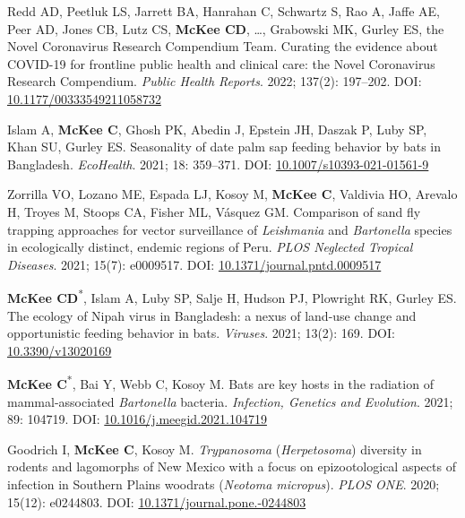 \documentclass{cv}
\begin{document}
\begin{pubenum}
\item Redd AD, Peetluk LS, Jarrett BA, Hanrahan C, Schwartz S, Rao A, Jaffe AE, Peer AD, Jones CB, Lutz CS, \textbf{McKee CD}, …, Grabowski MK, Gurley ES, the Novel Coronavirus Research Compendium Team. Curating the evidence about COVID-19 for frontline public health and clinical care: the Novel Coronavirus Research Compendium. \textit{Public Health Reports}. 2022; 137(2): 197--202. DOI: \href{https://doi.org/10.1177/00333549211058732}{10.1177/00333549211058732}

\item Islam A, \textbf{McKee C}, Ghosh PK, Abedin J, Epstein JH, Daszak P, Luby SP, Khan SU, Gurley ES. Seasonality of date palm sap feeding behavior by bats in Bangladesh. \textit{EcoHealth}. 2021; 18: 359--371. DOI: \href{https://doi.org/10.1007/s10393-021-01561-9}{10.1007/s10393-021-01561-9}

\item Zorrilla VO, Lozano ME, Espada LJ, Kosoy M, \textbf{McKee C}, Valdivia HO, Arevalo H, Troyes M, Stoops CA, Fisher ML, Vásquez GM. Comparison of sand fly trapping approaches for vector surveillance of \textit{Leishmania} and \textit{Bartonella} species in ecologically distinct, endemic regions of Peru. \textit{PLOS Neglected Tropical Diseases}. 2021; 15(7): e0009517. DOI: \href{https://doi.org/10.1371/journal.pntd.0009517}{10.1371/journal.pntd.0009517}

\item \textbf{McKee CD}\textsuperscript{*}, Islam A, Luby SP, Salje H, Hudson PJ, Plowright RK, Gurley ES. The ecology of Nipah virus in Bangladesh: a nexus of land-use change and opportunistic feeding behavior in bats. \textit{Viruses}. 2021; 13(2): 169. DOI: \href{https://doi.org/10.3390/v13020169}{10.3390/v13020169}

\item \textbf{McKee C}\textsuperscript{*}, Bai Y, Webb C, Kosoy M. Bats are key hosts in the radiation of mammal-associated \textit{Bartonella} bacteria. \textit{Infection, Genetics and Evolution}. 2021; 89: 104719. DOI: \href{https://doi.org/10.1016/j.meegid.2021.104719}{10.1016/j.meegid.2021.104719}

\item Goodrich I, \textbf{McKee C}, Kosoy M. \textit{Trypanosoma} (\textit{Herpetosoma}) diversity in rodents and lagomorphs of New Mexico with a focus on epizootological aspects of infection in Southern Plains woodrats (\textit{Neotoma micropus}). \textit{PLOS ONE}. 2020; 15(12): e0244803. DOI: \href{https://doi.org/10.1371/journal.pone.0244803}{10.1371/journal.pone.-0244803}


\end{pubenum}
\end{document}
